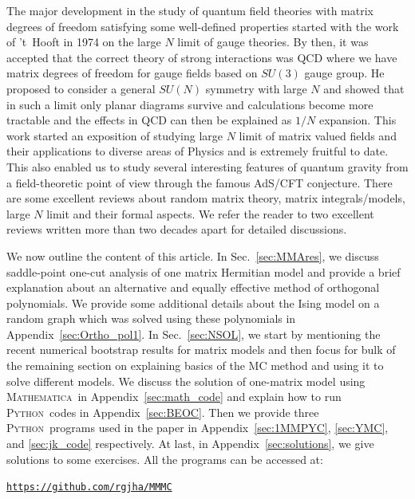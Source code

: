 \documentclass[letter,11pt]{article}
\newcommand{\MA}{\textsc{Mathematica}}
\newcommand{\PY}{\textsc{Python}}
\begin{document}
The major development in the study of quantum field theories with matrix degrees of freedom satisfying some well-defined properties started with the work of 't~Hooft in 1974 on the large $N$ limit of gauge theories. By then, it was accepted that the correct theory of 
strong interactions was QCD where we have matrix degrees of freedom for gauge fields based on $SU(3)$ gauge group. He proposed to consider a general $SU(N)$ 
symmetry with large $N$ and showed that in such a limit only planar diagrams survive and calculations become more tractable and the effects in QCD can then be explained as $1/N$ expansion. This work started an exposition of studying large $N$ limit of matrix valued fields and their applications to diverse areas of Physics and is extremely fruitful to date. This also enabled us to study several interesting features of quantum gravity from a field-theoretic point of view through the famous AdS/CFT conjecture. There are some excellent reviews about random matrix theory, matrix integrals/models, large $N$ limit 
and their formal aspects. We refer the reader to two excellent reviews written more than two decades 
apart \cite{DiFrancesco:1993cyw,Eynard:2015aea} for detailed discussions. 

We now outline the content of this article. In Sec.~\ref{sec:MMAres}, we discuss saddle-point one-cut analysis of one matrix Hermitian model and provide a brief explanation about an alternative and equally effective method of orthogonal polynomials. We provide some additional details about the Ising model on a random graph which was solved using these polynomials in Appendix~\ref{sec:Ortho_pol1}. In Sec.~\ref{sec:NSOL}, we start by mentioning the recent numerical bootstrap results for matrix models and then focus for bulk of the remaining section on explaining basics of the MC method and using it to solve different models. We discuss the solution of one-matrix model using \MA~in  Appendix~\ref{sec:math_code} and explain how to run \PY~codes in Appendix~\ref{sec:BEOC}. Then  we provide three  \PY~programs used in the paper in Appendix~\ref{sec:1MMPYC}, \ref{sec:YMC}, and \ref{sec:jk_code} respectively. At last, in Appendix~\ref{sec:solutions}, we give solutions to some exercises. All the programs can be accessed at:  
\begin{center} \texttt{\href{https://github.com/rgjha/MMMC}{https://github.com/rgjha/MMMC}} \end{center}
\end{document}
